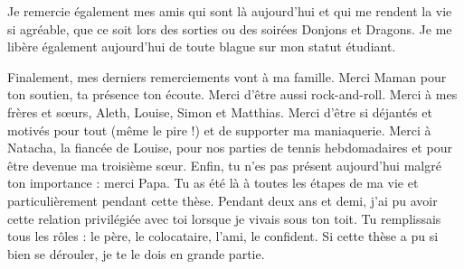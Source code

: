 Je remercie également mes amis qui sont là aujourd’hui et qui me rendent la vie si agréable, que ce soit lors des sorties ou des soirées Donjons et Dragons.
Je me libère également aujourd’hui de toute blague sur mon statut étudiant.


Finalement, mes derniers remerciements vont à ma famille.
Merci Maman pour ton soutien, ta présence ton écoute.
Merci d’être aussi rock-and-roll.
Merci à mes frères et s\oe{}urs, Aleth, Louise, Simon et Matthias.
Merci d’être si déjantés et motivés pour tout (même le pire !) et de supporter ma maniaquerie. Merci à Natacha, la fiancée de Louise, pour nos parties de tennis hebdomadaires et pour être devenue ma troisième s\oe{}ur.
Enfin, tu n’es pas présent aujourd’hui malgré ton importance : merci Papa.
Tu as été là à toutes les étapes de ma vie et particulièrement pendant cette thèse.
Pendant deux ans et demi, j’ai pu avoir cette relation privilégiée avec toi lorsque je vivais sous ton toit.
Tu remplissais tous les rôles : le père, le colocataire, l’ami, le confident.
Si cette thèse a pu si bien se dérouler, je te le dois en grande partie.

